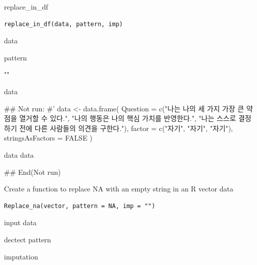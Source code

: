 \documentclass[a4paper]{book}
\begin{document}
%
\begin{Description}
replace\_in\_df
\end{Description}
%
\begin{Usage}
\begin{verbatim}
replace_in_df(data, pattern, imp)
\end{verbatim}
\end{Usage}
%
\begin{Arguments}
\begin{ldescription}
\item[\code{data}] data

\item[\code{pattern}] pattern

\item[\code{imp}] ""
\end{ldescription}
\end{Arguments}
%
\begin{Value}
data
\end{Value}
%
\begin{Examples}
\begin{ExampleCode}
## Not run: 
#'
data <- data.frame(
  Question = c("나는 나의 세 가지 가장 큰
  약점을 열거할 수 있다.", "나의 행동은 나의
  핵심 가치를 반영한다.", "나는 스스로 결정하기
  전에 다른 사람들의 의견을 구한다."),
  factor = c("자기", "자기", "자기"),
  stringsAsFactors = FALSE
)

data
data %

## End(Not run)
\end{ExampleCode}
\end{Examples}
%
\begin{Description}
Create a function to replace NA with an empty string in an R vector data
\end{Description}
%
\begin{Usage}
\begin{verbatim}
Replace_na(vector, pattern = NA, imp = "")
\end{verbatim}
\end{Usage}
%
\begin{Arguments}
\begin{ldescription}
\item[\code{vector}] input data

\item[\code{pattern}] dectect pattern

\item[\code{imp}] imputation
\end{ldescription}
\end{Arguments}
\end{document}
